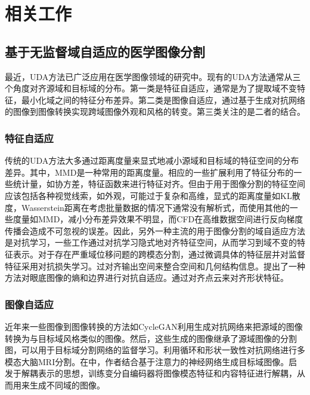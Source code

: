 \chapter{相关工作}

\label{cha:related work}


\section{基于无监督域自适应的医学图像分割}
最近，UDA方法已广泛应用在医学图像领域的研究中。现有的UDA方法通常从三个角度对齐源域和目标域的分布。第一类是特征自适应，通常是为了提取域不变特征，最小化域之间的特征分布差异。第二类是图像自适应，通过基于生成对抗网络的图像到图像转换实现跨域图像外观和风格的转变。第三类关注的是二者的结合。
\subsection{特征自适应}
传统的UDA方法大多通过距离度量来显式地减小源域和目标域的特征空间的分布差异。其中，MMD\cite{long2017deep}是一种常用的距离度量。相应的一些扩展利用了特征分布的一些统计量，如协方差\cite{sun2016deep}，特征函数\cite{wu2020cf}来进行特征对齐。但由于用于图像分割的特征空间应该包括各种视觉线索，如外观，可能过于复杂和高维，显式的距离度量如KL散度，Wasserstein距离在考虑批量数据的情况下通常没有解析式，而使用其他的一些度量如MMD，减小分布差异效果不明显，而CFD\cite{wu2020cf}在高维数据空间进行反向梯度传播会造成不可忽视的误差\cite{wu2021unsupervised}。因此，另外一种主流的用于图像分割的域自适应方法是对抗学习，一些工作通过对抗学习隐式地对齐特征空间，从而学习到域不变的特征表示。对于存在严重域位移问题的跨模态分割，\citeauthor{dou2018pnp}\cite{dou2018pnp}通过微调具体的特征层并对监督特征采用对抗损失学习。\citeauthor{tsai2018learning}\cite{tsai2018learning}过对齐输出空间来整合空间和几何结构信息。\citeauthor{wang2019boundary}\cite{wang2019boundary}提出了一种方法对眼底图像的熵和边界进行对抗自适应。\citeauthor{vesal2021adapt}\cite{vesal2021adapt}通过对齐点云来对齐形状特征。

\subsection{图像自适应}
近年来一些图像到图像转换的方法如CycleGAN\cite{zhu2017unpaired}利用生成对抗网络来把源域的图像转换为与目标域风格类似的图像。然后，这些生成的图像继承了源域图像的分割图，可以用于目标域分割网络的监督学习。\citeauthor{zhang2018translating}\cite{zhang2018translating}利用循环和形状一致性对抗网络进行多模态大脑MRI分割。在\citeauthor{liu2019unpaired}\cite{liu2019unpaired}中，作者结合基于注意力的神经网络生成目标域图像。\citeauthor{yang2019unsupervised}\cite{yang2019unsupervised}启发于解耦表示的思想，训练变分自编码器将图像模态特征和内容特征进行解耦，从而用来生成不同域的图像。

